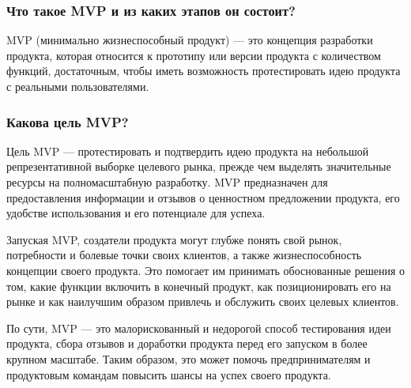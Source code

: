 \documentclass[letterpaper,10pt,russian]{sphinxmanual}
\begin{document}
\subsubsection{Что такое MVP и из каких этапов он состоит?}
\label{\detokenize{educational_materials/mvp/content:id2}}
\sphinxAtStartPar
MVP (минимально жизнеспособный продукт) — это концепция разработки продукта, которая относится к прототипу или версии продукта с количеством функций, достаточным, чтобы иметь возможность протестировать идею продукта с реальными пользователями.


\subsubsection{Какова цель MVP?}
\label{\detokenize{educational_materials/mvp/content:id3}}
\sphinxAtStartPar
Цель MVP — протестировать и подтвердить идею продукта на небольшой репрезентативной выборке целевого рынка, прежде чем выделять значительные ресурсы на полномасштабную разработку. MVP предназначен для предоставления информации и отзывов о ценностном предложении продукта, его удобстве использования и его потенциале для успеха.

\sphinxAtStartPar
Запуская MVP, создатели продукта могут глубже понять свой рынок, потребности и болевые точки своих клиентов, а также жизнеспособность концепции своего продукта. Это помогает им принимать обоснованные решения о том, какие функции включить в конечный продукт, как позиционировать его на рынке и как наилучшим образом привлечь и обслужить своих целевых клиентов.

\sphinxAtStartPar
По сути, MVP — это малорискованный и недорогой способ тестирования идеи продукта, сбора отзывов и доработки продукта перед его запуском в более крупном масштабе. Таким образом, это может помочь предпринимателям и продуктовым командам повысить шансы на успех своего продукта.
\end{document}
